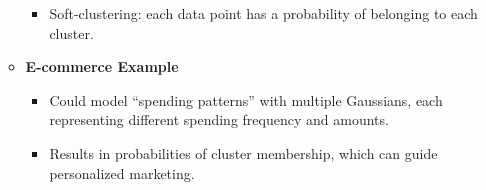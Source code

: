 \documentclass[10pt]{article}
\begin{document}
\begin{itemize}
\begin{itemize}
\begin{itemize}
            \item Soft-clustering: each data point has a probability of belonging to each cluster.
        \end{itemize}
        \item \textbf{E-commerce Example}
        \begin{itemize}
            \item Could model “spending patterns” with multiple Gaussians, each representing different spending frequency and amounts.
            \item Results in probabilities of cluster membership, which can guide personalized marketing.
        \end{itemize}
    \end{itemize}
\end{itemize}
\end{document}
